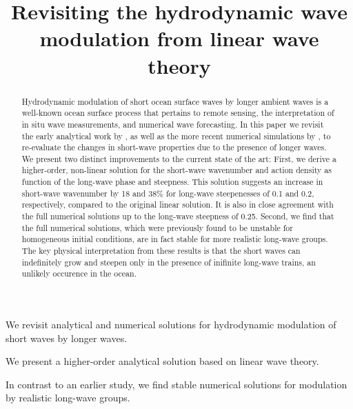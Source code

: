\documentclass[draft]{agujournal2019}
\begin{document}
\title{Revisiting the hydrodynamic wave modulation from linear wave theory}




\begin{keypoints}
\item We revisit analytical and numerical solutions for hydrodynamic modulation of short waves by longer waves.
\item We present a higher-order analytical solution based on linear wave theory.
\item In contrast to an earlier study, we find stable numerical solutions for modulation by realistic long-wave groups.
\end{keypoints}

\begin{abstract}
Hydrodynamic modulation of short ocean surface waves by longer ambient waves is
a well-known ocean surface process that pertains to remote sensing, the
interpretation of in situ wave measurements, and numerical wave forecasting.
In this paper we revisit the early analytical work by ,
as well as the more recent numerical simulations by ,
to re-evaluate the changes in short-wave properties due to the presence of longer waves.
We present two distinct improvements to the current state of the art:
First, we derive a higher-order, non-linear solution for the short-wave wavenumber
and action density as function of the long-wave phase and steepness.
This solution suggests an increase in short-wave wavenumber by 18 and 38\% for
long-wave steepenesses of 0.1 and 0.2, respectively, compared to the original
linear solution.
It is also in close agreement with the full numerical solutions up to the
long-wave steepness of 0.25.
Second, we find that the full numerical solutions, which were previously found
to be unstable for homogeneous initial conditions, are in fact stable for more
realistic long-wave groups.
The key physical interpretation from these results is that the short waves can
indefinitely grow and steepen only in the presence of inifinite long-wave trains,
an unlikely occurence in the ocean.
\end{abstract}
\end{document}
